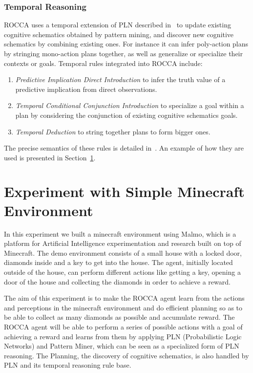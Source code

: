\documentclass[runningheads]{llncs}
\begin{document}
\subsubsection{Temporal Reasoning}
ROCCA uses a temporal extension of PLN described
in~\cite{Geisweiller2023TPLN} to update existing cognitive schematics
obtained by pattern mining, and discover new cognitive schematics by
combining existing ones.  For instance it can infer poly-action plans
by stringing mono-action plans together, as well as generalize or
specialize their contexts or goals.  Temporal rules integrated into
ROCCA include:
\begin{enumerate}
\item \emph{Predictive Implication Direct Introduction} to infer the
  truth value of a predictive implication from direct observations.
\item \emph{Temporal Conditional Conjunction Introduction} to
  specialize a goal within a plan by considering the conjunction of
  existing cognitive schematics goals.
\item \emph{Temporal Deduction} to string together plans to form
  bigger ones.
\end{enumerate}
The precise semantics of these rules is detailed
in~\cite{Geisweiller2023TPLN}.  An example of how they are used is
presented in Section~\ref{sec:minecraft}.

\section{Experiment with Simple Minecraft Environment}
\label{sec:minecraft}
In this experiment we built a minecraft environment using Malmo, which is a platform for Artificial Intelligence experimentation and research built on top of Minecraft. The demo environment consists of a small house with a locked door, diamonds inside and a key to get into the house. The agent, initially located outside of the house, can perform different actions like getting a key, opening a door of the house and collecting the diamonds in order to achieve a reward. \par
The aim of this experiment is to make the ROCCA agent learn from the actions and perceptions in the minecraft environment and do efficient planning so as to be able to collect as many diamonds as possible and accumulate reward. The ROCCA agent will be able to perform a series of possible actions with a goal of achieving a reward and learns from them by applying PLN (Probabilistic Logic Networks) and Pattern Miner, which can be seen as a specialized form of PLN reasoning. The Planning, the discovery of cognitive schematics, is also handled by PLN and its temporal reasoning rule base.
\end{document}

